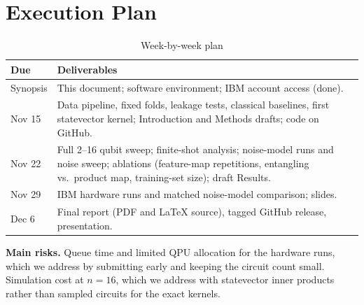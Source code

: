 \documentclass[conference]{IEEEtran}
\begin{document}
\section{Execution Plan}
\begin{table}[h]
\centering
\caption{Week-by-week plan}
\begin{tabular}{@{}p{}p{}@{}}
\toprule
Due & Deliverables \\
\midrule
Synopsis & This document; software environment; IBM account access (done). \\
Nov 15 & Data pipeline, fixed folds, leakage tests, classical baselines, first statevector kernel; Introduction and Methods drafts; code on GitHub. \\
Nov 22 & Full 2--16 qubit sweep; finite-shot analysis; noise-model runs and noise sweep; ablations (feature-map repetitions, entangling vs.\ product map, training-set size); draft Results. \\
Nov 29 & IBM hardware runs and matched noise-model comparison; slides. \\
Dec 6 & Final report (PDF and \LaTeX{} source), tagged GitHub release, presentation. \\
\bottomrule
\end{tabular}
\end{table}

\textbf{Main risks.} Queue time and limited QPU allocation for the hardware runs, which we address by submitting early and keeping the circuit count small. Simulation cost at $n=16$, which we address with statevector inner products rather than sampled circuits for the exact kernels.



\end{document}
